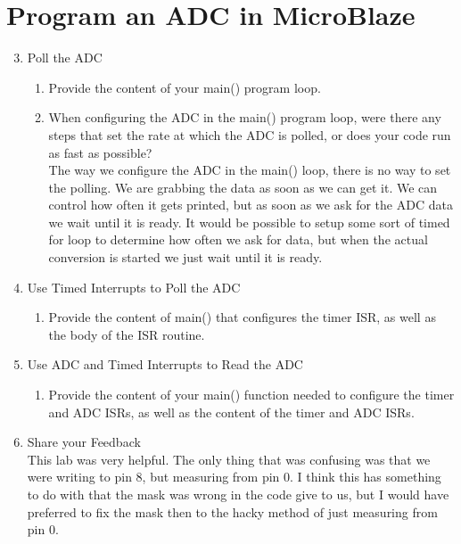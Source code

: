 \documentclass[10pt]{article}
\begin{document}
  \section*{Program an ADC in MicroBlaze}
    \begin{enumerate}
      \setcounter{enumi}{2}
      \item Poll the ADC 
      \begin{enumerate}
        \item Provide the content of your main() program loop.\\[1em]
          
            
        \item When configuring the ADC in the main() program loop, were there any steps that set the rate at which the ADC is polled, or does your code run as fast as possible?\\[1em]
          The way we configure the ADC in the main() loop, there is no way to set the polling. We are grabbing the data as soon as we can get it. We can control how often it gets printed, but as soon as we ask for the ADC data we wait until it is ready. It would be possible to setup some sort of timed for loop to determine how often we ask for data, but when the actual conversion is started we just wait until it is ready.
      \end{enumerate}

      \item Use Timed Interrupts to Poll the ADC
        \begin{enumerate}
          \item Provide the content of main() that configures the timer ISR, as well as the body of the ISR routine.\\[1em]
            
            
        \end{enumerate}

      \item Use ADC and Timed Interrupts to Read the ADC
        \begin{enumerate}
          \item Provide the content of your main() function needed to configure the timer and ADC ISRs, as well as the content of the timer and ADC ISRs.\\[1em]
            
        \end{enumerate}

      \item Share your Feedback\\[1em]
        This lab was very helpful. The only thing that was confusing was that we were writing to pin 8, but measuring from pin 0. I think this has something to do with that the mask was wrong in the code give to us, but I would have preferred to fix the mask then to the hacky method of just measuring from pin 0.
    \end{enumerate}
 
\end{document}

